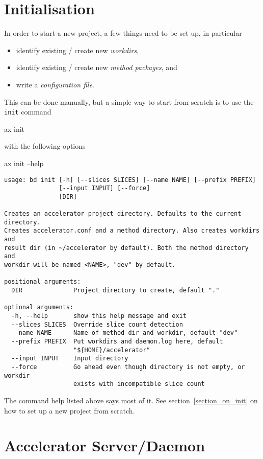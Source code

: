 \section{Initialisation}
In order to start a new project, a few things need to be set up, in
particular
\begin{itemize}
\item[] identify existing / create new \textsl{workdirs},
\item[] identify existing / create new \textsl{method packages}, and
\item[] write a \textsl{configuration file}.
\end{itemize}
This can be done manually, but a simple way to start from scratch is
to use the \texttt{init} command
\begin{shell}
  ax init
\end{shell}
with the following options
\begin{shell}
  ax init --help
\end{shell}
\begin{snugshade}
\begin{verbatim}
usage: bd init [-h] [--slices SLICES] [--name NAME] [--prefix PREFIX]
               [--input INPUT] [--force]
               [DIR]

Creates an accelerator project directory. Defaults to the current directory.
Creates accelerator.conf and a method directory. Also creates workdirs and
result dir (in ~/accelerator by default). Both the method directory and
workdir will be named <NAME>, "dev" by default.

positional arguments:
  DIR              Project directory to create, default "."

optional arguments:
  -h, --help       show this help message and exit
  --slices SLICES  Override slice count detection
  --name NAME      Name of method dir and workdir, default "dev"
  --prefix PREFIX  Put workdirs and daemon.log here, default
                   "${HOME}/accelerator"
  --input INPUT    Input directory
  --force          Go ahead even though directory is not empty, or workdir
                   exists with incompatible slice count
\end{verbatim}
\end{snugshade}
The command help listed above says most of it.  See
section~\ref{section_on_init} on how to set up a new project from
scratch.




\section{Accelerator Server/Daemon}

